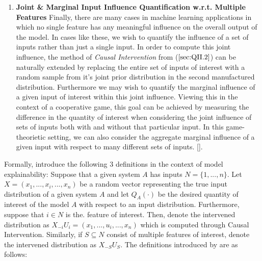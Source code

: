 \begin{enumerate}
        
        \item \textbf{Joint \& Marginal Input Influence Quantification w.r.t. Multiple Features}
        Finally, there are many cases in machine learning applications in which no single feature has any meaningful influence on the overall output of the model.  In cases like these, we wish to quantify the influence of a set of inputs rather than just a single input.  In order to compute this joint influence, the method of \textit{Causal Intervention} from ($\ref{sec:QII.2}$) can be naturally extended by replacing the entire set of inputs of interest with a random sample from it's joint prior distribution in the second manufactured distribution. Furthermore we may wish to quantify the marginal influence of a given input of interest within this joint influence. Viewing this in the context of a cooperative game, this goal can be achieved by measuring the difference in the quantity of interest when considering the joint influence of sets of inputs both with and without that particular input. In this game-theorietic setting, we can also consider the aggregate marginal influence of a given input with respect to many different sets of inputs. [].
    \end{enumerate}
    
    Formally, \citet{QII_MS3} introduce the following $3$ definitions in the context of model explainability: Suppose that a given system $A$ has inputs $N = \{1,...,n\}$.  Let $X = (x_1,...,x_i,...,x_n)$ be a random vector representing the true input distribution of a given system $A$ and let $Q_A(\cdot)$ be the desired quantity of interest of the model $A$ with respect to an input distribution. Furthermore, suppose that $i \in N$ is the. feature of interest.  Then, denote the intervened distribution as $X_{-i}U_i = (x_1,...,u_i,...,x_n)$ which is computed through Causal Intervention. Similarly, if $S \subseteq N$ consist of multiple features of interest, denote the intervened distribution as $X_{-S}U_S$. The definitions introduced by \citep{QII_MS3} are as follows:
    
